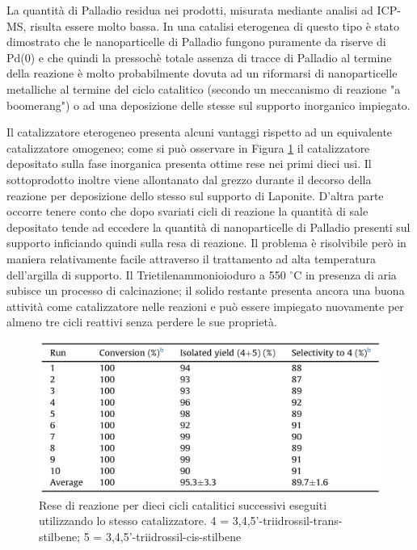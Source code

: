 \documentclass[a4paper, 12pt]{article}
\begin{document}
La quantità di Palladio residua nei prodotti, misurata mediante analisi ad ICP-MS, risulta essere molto bassa. In una catalisi eterogenea di questo tipo è stato dimostrato che le nanoparticelle di Palladio fungono puramente da riserve di Pd(0) e che quindi la pressochè totale assenza di tracce di Palladio al termine della reazione è molto probabilmente dovuta ad un riformarsi di nanoparticelle metalliche al termine del ciclo catalitico (secondo un meccanismo di reazione "a boomerang") o ad una deposizione delle stesse sul supporto inorganico impiegato.

Il catalizzatore eterogeneo presenta alcuni vantaggi rispetto ad un equivalente catalizzatore omogeneo; come si può osservare in Figura \ref{fig:perc_cata_resv} il catalizzatore depositato sulla fase inorganica presenta ottime rese nei primi dieci usi. Il sottoprodotto  inoltre viene allontanato dal grezzo durante il decorso della reazione per deposizione dello stesso sul supporto di Laponite. D'altra parte occorre tenere conto che dopo svariati cicli di reazione la quantità di sale depositato tende ad eccedere la quantità di nanoparticelle di Palladio presenti sul supporto inficiando quindi sulla resa di reazione. Il problema è risolvibile però in maniera relativamente facile attraverso il trattamento ad alta temperatura dell'argilla di supporto. Il Trietilenammonioioduro a 550 $^\circ$C in presenza di aria subisce un processo di calcinazione; il solido restante presenta ancora una buona attività come catalizzatore nelle reazioni e può essere impiegato nuovamente per almeno tre cicli reattivi senza perdere le sue proprietà.

\begin{figure}[H]
	\centering
	\includegraphics[width=\linewidth]{immagini/perc_cata_resv.png}
	\caption{Rese di reazione per dieci cicli catalitici successivi eseguiti utilizzando lo stesso catalizzatore. 4 = 3,4,5'-triidrossil-trans-stilbene; 5 = 3,4,5'-triidrossil-cis-stilbene}
	\label{fig:perc_cata_resv}
\end{figure}
\end{document}
